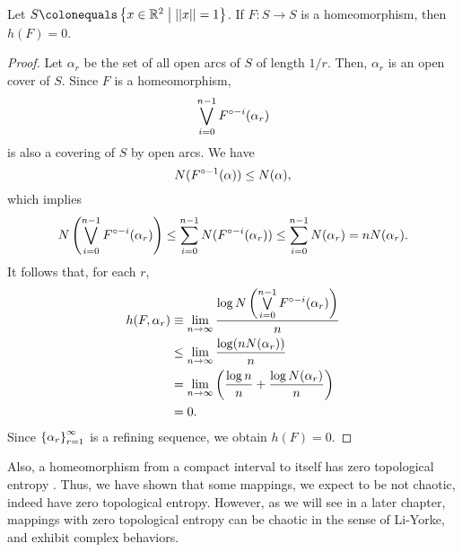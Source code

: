 \documentclass[12pt,twoside,draft]{book}
\begin{document}
  \begin{proposition}
    \citep{akm}
    Let $S \ceq \setst{x \in \R^2}{\norm{x} = 1}$.
    If $F: S \to S$ is a homeomorphism, then $h(F) = 0$.
    \begin{proof}
      Let $\alpha_r$ be the set of all open arcs of $S$ of length $1/r$.
      Then, $\alpha_r$ is an open cover of $S$.
      Since $F$ is a homeomorphism, 
      \begin{equation*}
        \bigvee\limits_{i = 0}^{n-1} F^{\circ -i}(\alpha_r)
      \end{equation*}
      is also a covering of $S$ by open arcs.
      We have
      \begin{equation*}
        N(F^{\circ -1}(\alpha)) \leq N(\alpha),
      \end{equation*}
      which implies
      \begin{equation*}
        N\left (  \bigvee\limits_{i = 0}^{n-1} F^{\circ -i}(\alpha_r)  \right )
        \leq \sum\limits_{i = 0}^{n-1} N(F^{\circ -i}(\alpha_r))
        \leq \sum\limits_{i = 0}^{n-1} N(\alpha_r)
        = n N(\alpha_r).
      \end{equation*}
      It follows that, for each $r$,
      \begin{align*}
        h(F, \alpha_r) 
        &\equiv \lim\limits_{n \to \infty} \frac{\log N\left (  \bigvee\limits_{i = 0}^{n-1} F^{\circ -i}(\alpha_r)  \right )}{n}  \\
        &\leq \lim\limits_{n \to \infty} \frac{\log (n N(\alpha_r))}{n}  \\
        &= \lim\limits_{n \to \infty}\left (  \frac{\log n}{n} + \frac{\log N(\alpha_r)}{n}  \right ) \\
        &= 0.
      \end{align*}
      Since $\left \{ \alpha_r \right \}^{\infty}_{r = 1}$ is a refining sequence, we obtain $h(F) = 0$.
    \end{proof}
  \end{proposition}
  Also, a homeomorphism from a compact interval to itself has zero topological entropy \citep[p.180]{walters}.
  Thus, we have shown that some mappings, we expect to be not chaotic, indeed have zero topological entropy. 
  However, as we will see in a later chapter, mappings with zero topological entropy can be chaotic in the sense of Li-Yorke, and exhibit complex behaviors.

  
  

  \printindex
  
\end{document}
